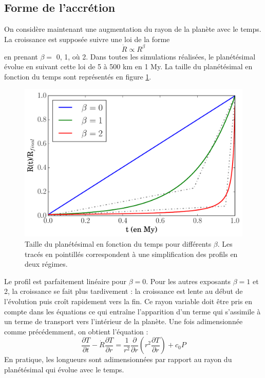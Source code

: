 \documentclass[10pt,a4paper]{article}
\numberwithin{equation}{section}
\begin{document}
\subsection{Forme de l'accrétion}

On considère maintenant une augmentation du rayon de la planète avec le temps. La croissance est supposée suivre une loi de la forme 
\begin{equation}
\dot{R} \propto R^\beta
\end{equation}
en prenant $\beta =$ 0, 1,  où 2. Dans toutes les simulations réalisées, le planétésimal évolue en suivant cette loi de 5 à 500 km en 1 My. La taille du planétésimal en fonction du temps sont représentés en figure \ref{rayon}.

\begin{figure}[h]
    \centering	    
	\includegraphics[scale=0.43]{figures/rayon.pdf}
    \caption{Taille du planétésimal en fonction du temps pour différents $\beta$. Les tracés en pointillés correspondent à une simplification des profils en deux régimes.}
    	\label{rayon} 
\end{figure}

Le profil est parfaitement linéaire pour $\beta = 0$. Pour les autres exposants $\beta = 1$ et 2, la croissance se fait plus tardivement : la croissance est lente au début de l'évolution puis croît rapidement vers la fin. Ce rayon variable doit être pris en compte dans les équations ce qui entraîne l'apparition d'un terme qui s'assimile à un terme de transport vers l'intérieur de la planète. Une fois adimensionnée comme précédemment, on obtient l'équation :
\begin{equation}
\dfrac{\partial T}{\partial t} - \dot{R} \dfrac{\partial T}{\partial r} = \frac{1}{r^2} \dfrac{\partial }{\partial r}\left( r^2 \dfrac{\partial T}{\partial r} \right) + c_0P
\label{accretion_adim}
\end{equation}
En pratique, les longueurs sont adimensionnées par rapport au rayon du planétésimal qui évolue avec le temps.
\end{document}
